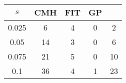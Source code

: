 \centering \begin{tabular}{c|c|c|c|c}
$s$	&CMH	&FIT	&GP	&\sc{Clear}\\\hline
0.025	&6	&4	&0	&2\\
0.05	&14	&3	&0	&6\\
0.075	&21	&5	&0	&10\\
0.1	&36	&4	&1	&23\\
\end{tabular}
